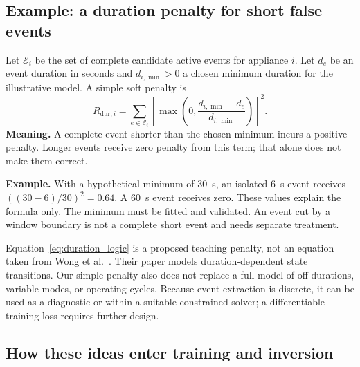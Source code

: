 \documentclass[11pt]{article}
\begin{document}
\subsection{Example: a duration penalty for short false events}

Let $\mathcal{E}_i$ be the set of complete candidate active events for appliance $i$. Let $d_e$ be an event duration in seconds and $d_{i,\min}>0$ a chosen minimum duration for the illustrative model. A simple soft penalty is
\begin{equation}
    R_{\mathrm{dur},i}=
    \sum_{e\in\mathcal{E}_i}
    \left[
    \max\left(0,\frac{d_{i,\min}-d_e}{d_{i,\min}}\right)
    \right]^2.
    \label{eq:duration_logic}
\end{equation}
\textbf{Meaning.} A complete event shorter than the chosen minimum incurs a positive penalty. Longer events receive zero penalty from this term; that alone does not make them correct.

\textbf{Example.} With a hypothetical minimum of 30~s, an isolated 6~s event receives $((30-6)/30)^2=0.64$. A 60~s event receives zero. These values explain the formula only. The minimum must be fitted and validated. An event cut by a window boundary is not a complete short event and needs separate treatment.

Equation~\eqref{eq:duration_logic} is a proposed teaching penalty, not an equation taken from Wong et al.~\cite{wong2014}. Their paper models duration-dependent state transitions. Our simple penalty also does not replace a full model of off durations, variable modes, or operating cycles. Because event extraction is discrete, it can be used as a diagnostic or within a suitable constrained solver; a differentiable training loss requires further design.

\subsection{How these ideas enter training and inversion}
\end{document}
